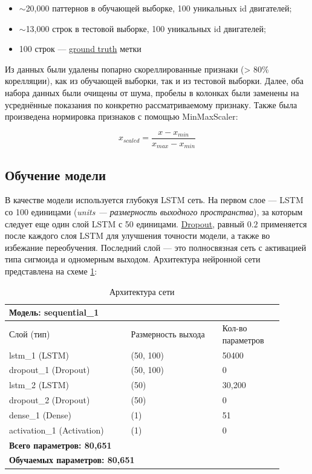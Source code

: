 \documentclass[14pt]{extarticle}
\begin{document}
\begin{itemize}
    \item $\sim$20,000 паттернов в обучающей выборке, 100 уникальных id двигателей;
    \item $\sim$13,000 строк в тестовой выборке, 100 уникальных id двигателей;
    \item 100 строк --- \hyperref[glossary]{ground truth} метки
\end{itemize}

Из данных были удалены попарно скореллированные признаки (> 80\% корелляции), как из обучающей выборки, так и из тестовой выборки. Далее, оба набора данных были очищены от шума, пробелы в колонках были заменены на усреднённые показания по конкретно рассматриваемому признаку. Также была произведена нормировка признаков с помощью MinMaxScaler:

$$x_{scaled} = \frac{x - x_{min}}{x_{max} - x_{min}}$$ 



\subsection{Обучение модели}

В качестве модели используется глубокуя LSTM сеть. На первом слое --- LSTM со 100 единицами ({\it units --- размерность выходного пространства}), за которым следует еще один слой LSTM с 50 единицами. \hyperref[glossary]{Dropout}, равный $0.2$ применяется после каждого слоя LSTM для улучшения точности модели, а также во избежание переобучения. Последний слой --- это полносвязная сеть с активацией типа сигмоида и одномерным выходом. Архитектура нейронной сети представлена на схеме \ref{table_1}:

\begin{table}[h]
	\large
	\centering
	\begin{tabular}{p{0.4\linewidth}p{0.3\linewidth}p{0.2\linewidth}}
		\multicolumn{3}{p{0.9\linewidth}}{{\bf Модель: sequential\_1}} \\
		\hline
		Слой (тип) & Размерность выхода & Кол-во параметров \\
		\hline
		\hline
		lstm\_1 (LSTM) & (50, 100) & 50400 \\
		\hline
		dropout\_1 (Dropout) & (50, 100) & 0 \\
		\hline
		lstm\_2 (LSTM) & (50) & 30,200 \\
		\hline
		dropout\_2 (Dropout) & (50) & 0 \\
		\hline
		dense\_1 (Dense) & (1) & 51 \\
		\hline
		activation\_1 (Activation) & (1) & 0 \\
		\hline
		\hline
		\multicolumn{3}{p{0.9\linewidth}}{{\bf Всего параметров: 80,651}} \\[-3mm]
		\multicolumn{3}{p{0.9\linewidth}}{{\bf Обучаемых параметров: 80,651}} \\
	\end{tabular}
	\caption{Архитектура сети}
	\label{table_1}
\end{table}
\end{document}
